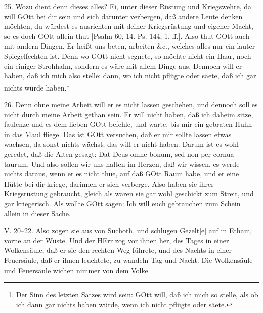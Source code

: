 25. Wozu dient denn dieses alles? Ei, unter dieser Rüstung und Kriegswehre, da will GOtt bei dir sein und sich darunter verbergen, daß andere Leute denken möchten, du würdest es ausrichten mit deiner Kriegsrüstung und eigener Macht, so es doch GOtt allein thut [Psalm 60, 14. Ps. 144, 1. ff.]. Also thut GOtt auch mit andern Dingen. Er heißt uns beten, arbeiten \&c., welches alles nur ein lauter Spiegelfechten ist. Denn wo GOtt nicht segnete, so möchte nicht ein Haar, noch ein einiger Strohhalm, sondern es wäre mit allem Dinge aus. Dennoch will er haben, daß ich mich also stelle: dann, wo ich nicht pflügte oder säete, daß ich gar nichts würde haben.\footnote{Der Sinn des letzten Satzes wird sein: GOtt will, daß ich mich so stelle, als ob ich dann gar nichts haben würde, wenn ich nicht pflügte oder säete.}

26. Denn ohne meine Arbeit will er es nicht lassen geschehen, und dennoch soll es nicht durch meine Arbeit gethan sein. Er will nicht haben, daß ich daheim sitze, faulenze und es dem lieben GOtt befehle, und warte, bis mir ein gebraten Huhn in das Maul fliege. Das ist GOtt versuchen, daß er mir sollte lassen etwas wachsen, da sonst nichts wächst; das will er nicht haben. Darum ist es wohl geredet, daß die Alten gesagt: Dat Deus omne bonum, sed non per cornua taurum. Und also sollen wir uns halten im Herzen, daß wir wissen, es werde nichts daraus, wenn er es nicht thue, auf daß GOtt Raum habe, und er eine Hütte bei dir kriege, darinnen er sich verberge. Also haben sie ihrer Kriegsrüstung gebraucht, gleich als wären sie gar wohl geschickt zum Streit, und gar kriegerisch. Als wollte GOtt sagen: Ich will euch gebrauchen zum Schein allein in dieser Sache.

\begin{schriftzitat}
V. 20–22. Also zogen sie aus von Suchoth, und schlugen Gezelt[e] auf in Etham, vorne an der Wüste. Und der HErr zog vor ihnen her, des Tages in einer Wolkensäule, daß er sie den rechten Weg führete, und des Nachts in einer Feuersäule, daß er ihnen leuchtete, zu wandeln Tag und Nacht. Die Wolkensäule und Feuersäule wichen nimmer von dem Volke.
\end{schriftzitat}

